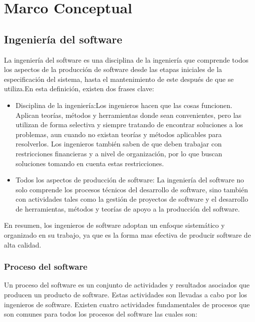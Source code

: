 
\chapter{Marco Conceptual} %

\label{Capitulo2} %

\section{ Ingeniería del software}
La ingeniería del software es una disciplina de la ingeniería que comprende todos los aspectos de la producción de software desde las etapas iniciales de la especificación del sistema, hasta el mantenimiento de este después de que se utiliza.En esta definición, existen dos frases clave:\\

\begin{itemize}
	\item Disciplina de la ingeniería:Los ingenieros hacen que las cosas funcionen. Aplican teorías, métodos y herramientas donde sean convenientes, pero las utilizan de forma selectiva y siempre tratando de encontrar soluciones a los problemas, aun cuando no existan teorías y métodos aplicables para resolverlos. Los ingenieros también saben de que deben trabajar con restricciones financieras y a nivel de organización, por lo que buscan soluciones tomando en cuenta estas restricciones.
	\item Todos los aspectos de producción de software: La ingeniería del software no solo comprende los procesos técnicos del desarrollo de software, sino también con actividades tales como la gestión de proyectos de software y el desarrollo de herramientas, métodos y teorías de apoyo a la producción del software. 
\end{itemize}
En resumen, los ingenieros de software adoptan un enfoque sistemático y organizado en su trabajo, ya que es la forma mas efectiva de producir software de alta calidad.

\subsection{Proceso del software}
Un proceso del software es un conjunto de actividades y resultados asociados que producen un producto de software. Estas actividades son llevadas a cabo por los ingenieros de software. Existen cuatro actividades fundamentales de procesos que son comunes para todos los procesos del software las cuales son:\\

